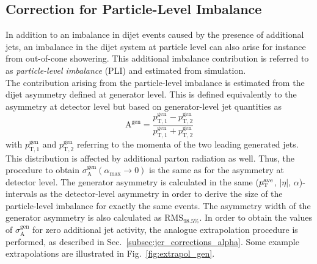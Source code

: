 \subsection{Correction for Particle-Level Imbalance}
\label{subsec:jer_corrections_pli}
In addition to an imbalance in dijet events caused by the presence of additional jets, an imbalance in the dijet system at particle level can also arise for instance from out-of-cone showering. This additional imbalance contribution is referred to as \textit{particle-level imbalance} (PLI) and estimated from simulation. \\
The contribution arising from the particle-level imbalance is estimated from the dijet asymmetry defined at generator level. This is defined equivalently to the asymmetry at detector level but based on generator-level jet quantities as
\begin{equation}
  \mathrm{A^{gen}} = \frac{p_\mathrm{T,1}^\mathrm{gen} - p_\mathrm{T,2}^\mathrm{gen}}{p_\mathrm{T,1}^\mathrm{gen} + p_\mathrm{T,2}^\mathrm{gen}} 
 \end{equation}
with $p_\mathrm{T,1}^\mathrm{gen}$ and $p_\mathrm{T,2}^\mathrm{gen}$ referring to the momenta of the two leading generated jets. This distribution is affected by additional parton radiation as well. Thus, the procedure to obtain $\sigma^\mathrm{gen}_\mathrm{A}(\alpha_\mathrm{max} \rightarrow 0)$ is the same as for the asymmetry at detector level. The generator asymmetry is calculated in the same ($p_{\text{T}}^\mathrm{ave}$, $|\eta|$, $\alpha$)-intervals as the detector-level asymmetry in order to derive the size of the particle-level imbalance for exactly the same events. The asymmetry width of the generator asymmetry is also calculated as $\mathrm{RMS}_{98.5\%}$. In order to obtain the values of $\sigma^\mathrm{gen}_\mathrm{A}$ for zero additional jet activity, the analogue extrapolation procedure is performed, as described in Sec.~\ref{subsec:jer_corrections_alpha}. Some example extrapolations are illustrated in Fig.~\ref{fig:extrapol_gen}. 
